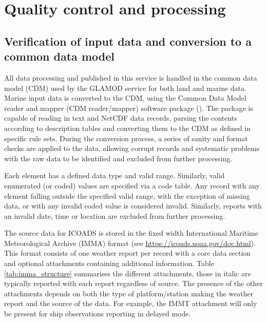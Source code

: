 \section{Quality control and processing} \label{processing}
\subsection{Verification of input data and conversion to a common data model}\label{format-check}
All data processing and published in this service is handled in the common data model (CDM) used by the GLAMOD service for both land and marine data.
Marine input data is converted to the CDM, using the Common Data Model reader and mapper (CDM reader/mapper) software package (\cite{lierhammer_2024_14135493}).
The package is capable of reading in text and NetCDF data records, parsing the contents according to description tables and converting them to the CDM as defined in specific rule sets. 
During the conversion process, a series of sanity and format checks are applied to the data, allowing corrupt records and systematic problems with the raw data to be identified and excluded from further processing.

Each element has a defined data type and valid range. 
Similarly, valid enumerated (or coded) values are specified via a code table.
Any record with any element falling outside the specified valid range, with the exception of missing data, or with any invalid coded value is considered invalid.
Similarly, reports with an invalid date, time or location are excluded from further processing. 


The source data for ICOADS is stored in the fixed width International Maritime Meteorological Archive (IMMA) format (see \url{https://icoads.noaa.gov/doc.html}). 
This format consists of one weather report per record with a core data section and optional attachments containing additional information.
Table \ref{tab:imma_structure} summarises the different attachments, those in italic are typically reported with each report regardless of source. 
The presence of the other attachments depends on both the type of platform/station making the weather report and the source of the data. 
For example, the IMMT attachment will only be present for ship observations reporting in delayed mode.

